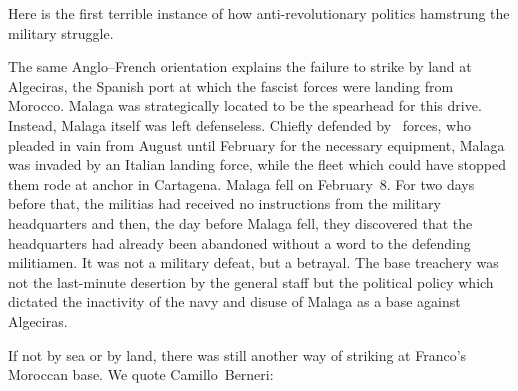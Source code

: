 Here is the first terrible instance of how anti-revolutionary politics hamstrung the military struggle.

\indexCNT{}
The same Anglo--French orientation explains the failure to strike by land at Algeciras, the Spanish port at which the fascist forces were landing from Morocco. Malaga was strategically located to be the spearhead for this drive. Instead, Malaga itself was left defenseless. Chiefly defended by \CNT\ forces, who pleaded in vain from August until February for the necessary equipment, Malaga was invaded by an Italian landing force, while the fleet which could have stopped them rode at anchor in Cartagena. Malaga fell on February~8. For two days before that, the militias had received no instructions from the military headquarters and then, the day before Malaga fell, they discovered that the headquarters had already been abandoned without a word to the defending militiamen. It was not a military defeat, but a betrayal. The base treachery was not the last-minute desertion by the general staff but the political policy which dictated the inactivity of the navy and disuse of Malaga as a base against Algeciras.%

If not by sea or by land, there was still another way of striking at Franco’s Moroccan base. We quote Camillo~Berneri:

